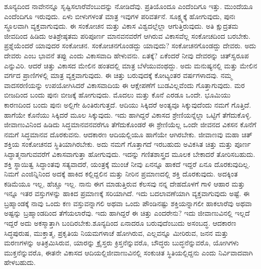 ಶೂನ್ಯದಿಂದ ನಾವೇನನ್ನೂ ಸೃಷ್ಟಿಸಲಾರೆವೆಂಬುದನ್ನು ನೋಡಿದೆವು. ಪ್ರತಿಯೊಂದೂ ಎಂದೆಂದಿಗೂ ಇತ್ತು. ಮುಂದೆಯೂ ಎಂದೆಂದಿಗೂ ಇರುವುದು. ಏಳು ಬೀಳುಗಳಂತೆ ಮಾತ್ರ ಇವುಗಳ ಪರಿವರ್ತನೆ. ಸೂಕ್ಷ್ಮಕ್ಕೆ ಹೋಗುವುದು, ಪುನಃ ಸ್ಥೂಲವಾಗಿ ವ್ಯಕ್ತವಾಗುವುದು. ಈ ಸಂಕೋಚನ ಮತ್ತು ವಿಕಾಸ ವಿಶ್ವದಲ್ಲೆಲ್ಲಾ ಆಗುತ್ತಿರುವುದು. ಅತಿ ಕ್ಷುದ್ರತಮ ಜೀವದಿಂದ ಹಿಡಿದು ಅತಿಶ್ರೇಷ್ಠತಮ ಪರಿಪೂರ್ಣ ಮಾನವನವರೆಗೆ ಆಗಿರುವ ವಿಕಾಸವೆಲ್ಲ ಸಂಕೋಚದಿಂದ ಬರಬೇಕು. ಪ್ರಶ್ನೆಯೆಂದರೆ ಯಾವುದರ ಸಂಕೋಚನ. ಸಂಕೋಚನಗೊಂಡದ್ದು ಯಾವುದು? ಸಂಕೋಚನಗೊಂಡದ್ದು ದೇವರು. ಅದು ದೇವರು ಎಂಬ ಭಾವನೆ ತಪ್ಪು ಎಂದು ವಿಕಾಸವಾದಿ ಹೇಳುವನು. ಏತಕ್ಕೆ? ಏಕೆಂದರೆ ನೀವು ದೇವರನ್ನು ಚಿತ್​ಸ್ವರೂಪ ಎನ್ನುವಿರಿ. ಆದರೆ ಚಿತ್ತು ವಿಕಾಸದ ಮೇಲಿನ ಹಂತದಲ್ಲಿ ಮಾತ್ರ ಬೆಳೆಯುವಂಥದ್ದು. ಅದು ಮನುಷ್ಯನಲ್ಲಿ ಮತ್ತು ಮೇಲಿನ ವರ್ಗದ ಪ್ರಾಣಿಗಳಲ್ಲಿ ಮಾತ್ರ ವ್ಯಕ್ತವಾಗುವುದು. ಈ ಚಿತ್ತು ಬರುವುದಕ್ಕೆ ಕೋಟ್ಯಂತರ ವರ್ಷಗಳಾದವು. ನಮ್ಮ ವಾದಸರಣಿಯನ್ನು ಉಪಯೋಗಿಸಿದರೆ ವಿಕಾಸವಾದಿಯ ಈ ಆಕ್ಷೇಪಣೆಗೆ ಬುಡವಿಲ್ಲವೆಂದು ಗೊತ್ತಾಗುವುದು. ಮರ ಬೀಜದಿಂದ ಬಂದು ಪುನಃ ಬೀಜಕ್ಕೆ ಹೋಗುವುದು. ಮೊದಲು ಮತ್ತು ಕೊನೆ ಎರಡೂ ಒಂದೇ. ಭೂಮಿಯು ಕಾರಣದಿಂದ ಬಂದು ಪುನಃ ಅಲ್ಲಿಗೇ ಹಿಂತಿರುಗುತ್ತದೆ. ಆದಿಯು ಸಿಕ್ಕಿದರೆ ಅಂತ್ಯವೂ ಸಿಕ್ಕುವುದೆಂದು ನಮಗೆ ಗೊತ್ತಿದೆ. ಹಾಗೆಯೇ ಕೊನೆಯು ಸಿಕ್ಕಿದರೆ ಮೂಲ ಸಿಕ್ಕುವುದು. ಇದು ಹಾಗಿದ್ದರೆ ವಿಕಾಸದ ಶ್ರೇಣಿಯನ್ನೆಲ್ಲಾ ಒಟ್ಟಿಗೆ ತೆಗೆದುಕೊಳ್ಳಿ. ಜೀವಾಣುವಿನಿಂದ ಹಿಡಿದು ಸಿದ್ಧಮಾನವನವರೆಗೂ ತೆಗೆದುಕೊಂಡರೆ ಈ ಶ್ರೇಣಿಯೆಲ್ಲ ಒಂದೇ ಜೀವನದ ವಿಕಸನ ಕೊನೆಗೆ ನಮಗೆ ಸಿದ್ಧಮಾನವ ದೊರಕುವನು. ಆದಕಾರಣ ಆದಿಯಲ್ಲಿಯೂ ಹಾಗೆಯೇ ಆಗಿರಬೇಕು. ಜೀವಾಣವು ಮಹಾ ಚಿತ್​ಶಕ್ತಿಯ ಸಂಕೋಚನದ ಸ್ಥಿತಿಯಾಗಿರಬೇಕು. ಅದು ನಮಗೆ ಗೊತ್ತಾಗದೆ ಇರಬಹುದು ಅವಿಕಸಿತ ಚಿತ್ತು ಮತ್ತು ಪೂರ್ಣ ಸಿದ್ಧಾತ್ಮನಾಗುವವರೆಗೆ ವಿಕಾಸವಾಗುತ್ತಾ ಹೋಗುವುದು. ಇದನ್ನು ಗಣಿತಶಾಸ್ತ್ರದ ಮೂಲಕ ಬೇಕಾದರೆ ತೋರಿಸಬಹುದು. ಶಕ್ತಿ ಸ್ಥಾಯಿತ್ವ ಸಿದ್ಧಾಂತವು ಸತ್ಯವಾದರೆ, ಯಂತ್ರಕ್ಕೆ ಮುಂಚೆ ನೀವು ಏನನ್ನೂ ಹಾಕದೆ ಇದ್ದರೆ ಏನೂ ದೊರಕುವುದಿಲ್ಲ. ನಿಮಗೆ ಎಂಜಿನ್ನಿನಿಂದ ಅದಕ್ಕೆ ಹಾಕಿದ ಕಲ್ಲಿದ್ದಲಿನ ಮತ್ತು ನೀರಿನ ಪ್ರಮಾಣದಲ್ಲಿ ಶಕ್ತಿ ದೊರಕುವುದು. ಅದಕ್ಕಿಂತ ಕಡಿಮೆಯೂ ಇಲ್ಲ, ಹೆಚ್ಚೂ ಇಲ್ಲ. ನಾನು ಈಗ ಮಾಡುತ್ತಿರುವ ಕೆಲಸವು ನನ್ನ ದೇಹದೊಳಗೆ ಗಾಳಿ ಆಹಾರ ಮತ್ತು ಇನ್ನೂ ಇತರ ವಸ್ತುಗಳನ್ನು ಹಾಕಿದ ಪ್ರಮಾಣಕ್ಕೆ ಸರಿಯಾಗಿದೆ. ಇದು ಬದಲಾವಣೆಯಾಗಿ ವ್ಯಕ್ತವಾಗುವುದು ಅಷ್ಟೆ. ಈ ಬ್ರಹ್ಮಾಂಡಕ್ಕೆ ನಾವು ಒಂದು ಕಣ ವಸ್ತುವನ್ನಾಗಲಿ ಅಥವಾ ಒಂದು ಪೌಂಡಿನಷ್ಟು ಶಕ್ತಿಯನ್ನಾಗಲೀ ಹಾಕಲಾರೆವು ಅಥವಾ ಅಷ್ಟನ್ನು ಬ್ರಹ್ಮಾಂಡದಿಂದ ತೆಗೆಯಲಾರೆವು. ಇದು ಹಾಗಿದ್ದರೆ ಈ ಚಿತ್ತು ಎಂದರೇನು? ಇದು ಜೀವಾಣುವಿನಲ್ಲಿ ಇಲ್ಲದೆ ಇದ್ದರೆ ಅದು ಅಕಸ್ಮಾತ್ತಾಗಿ ಬಂದಿರಬೇಕು.\break ಶೂನ್ಯದಿಂದ ಏನಾದರೂ ಬರುವುದೆಂಬುದು ಅಸಂಬದ್ಧ. ಆದಕಾರಣ ಸಿದ್ಧಪುರುಷ, ಮುಕ್ತಾತ್ಮ, ಪ್ರಕೃತಿಯ ನಿಯಮಗಳಾಚೆ ಹೋಗಿರುವ, ಎಲ್ಲವನ್ನೂ ಮೀರಿರುವ, ಜನನ ಮತ್ತು ಮರಣಗಳನ್ನು ಅತಿಕ್ರಮಿಸಿರುವ, ಯಾರನ್ನು ಕ್ರೈಸ್ತರು ಕ್ರಿಸ್ತನೆನ್ನುವರೊ, ಬೌದ್ಧರು ಬುದ್ಧನೆನ್ನುವರೊ, ಯೋಗಿಗಳು ಮುಕ್ತನೆನ್ನುವರೊ, ಈತನೇ ವಿಕಾಸದ ಆದಿಯಲ್ಲಿ\break ಜೀವಾಣುವಿನಲ್ಲಿ ಸಂಕುಚಿತ ಸ್ಥಿತಿಯಲ್ಲಿದ್ದನು ಎಂದು ನಿರ್ವಿವಾದವಾಗಿ ಹೇಳಬಹುದು.


